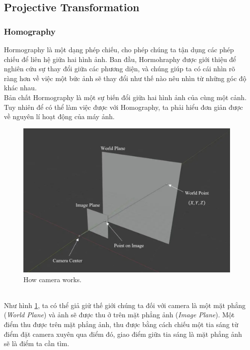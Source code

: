 \documentclass{article}
\begin{document}
\subsection{Projective Transformation}
\subsubsection{Homography}
Hormography là một dạng phép chiếu, cho phép chúng ta tận dụng các phép chiếu để liên hệ giữa hai hình ảnh. Ban đầu, Hormohraphy được giới thiệu để nghiên cứu sự thay đổi giữa các phương diện, và chúng giúp ta có cái nhìn rõ ràng hơn về việc một bức ảnh sẽ thay đổi như thế nào nêu nhìn từ những góc độ khác nhau.\\
Bản chất Hormography là một sự biến đổi giữa hai hình ảnh của cùng một cảnh.\\
Tuy nhiên để có thể làm việc được với Homography, ta phải hiểu đơn giản được về nguyên lí hoạt động của máy ảnh.\\
\begin{figure}[ht!]
    \centering
    \includegraphics[width = 0.8\linewidth]{fig5.jpg}
    \caption{How camera works.}
    \label{fig5}
\end{figure}
\phantom{a}\\
Như hình \ref{fig5}, ta có thể giả giử thế giới chúng ta đối với camera là một mặt phẳng (\textit{World Plane}) và ảnh sẽ được thu ở trên mặt phẳng ảnh (\textit{Image Plane}). Một điểm thu được trên mặt phẳng ảnh, thu được bằng cách chiếu một tia sáng từ điểm đặt camera xuyên qua điểm đó, giao điểm giữa tia sáng là mặt phẳng ảnh sẽ là điểm ta cần tìm.
\end{document}
